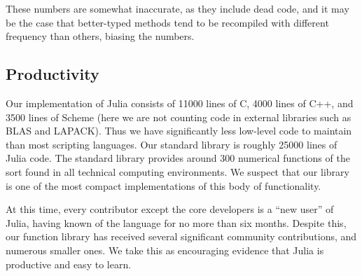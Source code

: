 \documentclass[9pt]{sigplanconf}
\newcommand{\Matlab}{MATLAB\textsuperscript{\tiny\textregistered}}
\begin{document}
These numbers are somewhat inaccurate, as they include dead code, and
it may be the case that better-typed methods tend to be recompiled with
different frequency than others, biasing the numbers.


\subsection{Productivity}

Our implementation of Julia consists of 11000 lines of C, 4000 lines
of C++, and 3500 lines of Scheme (here we are not counting code in
external libraries such as BLAS and LAPACK).  Thus we have
significantly less low-level code to maintain than most scripting
languages.  Our standard library is roughly 25000 lines of Julia code.
The standard library provides around 300 numerical functions of the
sort found in all technical computing environments. We suspect that
our library is one of the most compact implementations of this body of
functionality.

At this time, every contributor except the core developers is a ``new
user'' of Julia, having known of the language for no more than six
months.  Despite this, our function library has received several
significant community contributions, and numerous smaller ones. We
take this as encouraging evidence that Julia is productive and easy to
learn.



\end{document}
